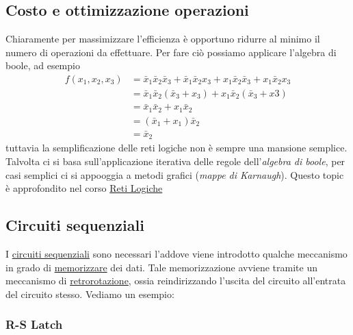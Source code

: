 \subsection{Costo e ottimizzazione operazioni}
Chiaramente per massimizzare l'efficienza è opportuno ridurre al minimo il numero di operazioni da effettuare. Per fare ciò possiamo applicare l'algebra di boole, ad esempio
\[
	\begin{aligned}
		f\left(x_1, x_2, x_3\right) & =\bar{x}_1 \bar{x}_2 \bar{x}_3+\bar{x}_1 \bar{x}_2 x_3+x_1 \bar{x}_2 \bar{x}_3+x_1 \bar{x}_2 x_3 \\
		                            & =\bar{x}_1 \bar{x}_2\left(\bar{x}_3+x_3\right)+x_1 \bar{x}_2\left(\bar{x}_3+x 3\right)           \\
		                            & =\bar{x}_1 \bar{x}_2+x_1 \bar{x}_2                                                               \\
		                            & =\left(\bar{x}_1+x_1\right) \bar{x}_2                                                            \\
		                            & =\bar{x}_2
	\end{aligned}
\]
tuttavia la semplificazione delle reti logiche non è sempre una mansione semplice. Talvolta ci si basa sull'applicazione iterativa delle regole dell'\textit{algebra di boole}, per casi semplici ci si appooggia a metodi grafici (\textit{mappe di Karnaugh}). Questo topic è approfondito nel corso \underline{Reti Logiche}
\subsection{Circuiti sequenziali}
I \underline{circuiti sequenziali} sono necessari l'addove viene introdotto qualche meccanismo in grado di \underline{memorizzare} dei dati. Tale memorizzazione avviene tramite un meccanismo di \underline{retrorotazione}, ossia reindirizzando l'uscita del circuito all'entrata del circuito stesso. Vediamo un esempio:
\subsubsection*{R-S Latch}

